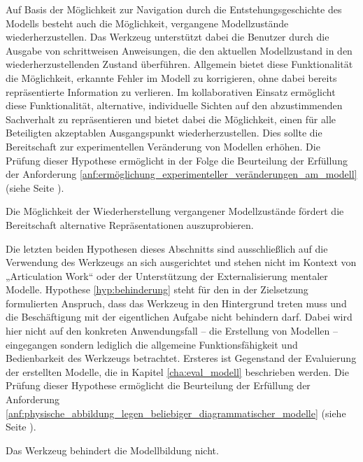 Auf Basis der Möglichkeit zur Navigation durch die Entstehungsgeschichte des Modells besteht auch die Möglichkeit, vergangene Modellzustände wiederherzustellen. Das Werkzeug unterstützt dabei die Benutzer durch die Ausgabe von schrittweisen Anweisungen, die den aktuellen Modellzustand in den wiederherzustellenden Zustand überführen. Allgemein bietet diese Funktionalität die Möglichkeit, erkannte Fehler im Modell zu korrigieren, ohne dabei bereits repräsentierte Information zu verlieren. Im kollaborativen Einsatz ermöglicht diese Funktionalität, alternative, individuelle Sichten auf den abzustimmenden Sachverhalt zu repräsentieren und bietet dabei die Möglichkeit, einen für alle Beteiligten akzeptablen Ausgangspunkt wiederherzustellen. Dies sollte die Bereitschaft zur experimentellen Veränderung von Modellen erhöhen. Die Prüfung dieser Hypothese ermöglicht in der Folge die Beurteilung der Erfüllung der Anforderung \ref{anf:ermöglichung_experimenteller_veränderungen_am_modell} (siehe Seite \pageref{anf:ermöglichung_experimenteller_veränderungen_am_modell}).

\begin{hyp}
	\label{hyp:wiederherstellung}
	Die Möglichkeit der Wiederherstellung vergangener Modellzustände fördert die Bereitschaft alternative Repräsentationen auszuprobieren.
\end{hyp}

Die letzten beiden Hypothesen dieses Abschnitts sind ausschließlich auf die Verwendung des Werkzeugs an sich ausgerichtet und stehen nicht im Kontext von „Articulation Work“ oder der Unterstützung der Externalisierung mentaler Modelle. Hypothese \ref{hyp:behinderung} steht für den in der Zielsetzung formulierten Anspruch, dass das Werkzeug in den Hintergrund treten muss und die Beschäftigung mit der eigentlichen Aufgabe nicht behindern darf. Dabei wird hier nicht auf den konkreten Anwendungsfall -- die Erstellung von Modellen -- eingegangen sondern lediglich die allgemeine Funktionsfähigkeit und Bedienbarkeit des Werkzeugs betrachtet. Ersteres ist Gegenstand der Evaluierung der erstellten Modelle, die in Kapitel \ref{cha:eval_modell} beschrieben werden. Die Prüfung dieser Hypothese ermöglicht die Beurteilung der Erfüllung der Anforderung \ref{anf:physische_abbildung_legen_beliebiger_diagrammatischer_modelle} (siehe Seite \pageref{anf:physische_abbildung_legen_beliebiger_diagrammatischer_modelle}).

\begin{hyp}
	\label{hyp:behinderung}
	Das Werkzeug behindert die Modellbildung nicht.
\end{hyp}

